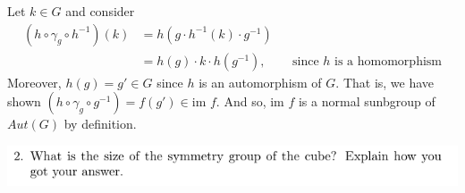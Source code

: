 \documentclass[12pt,letterpaper,boxed]{hmcpset}
\newcommand{\im}{\text{im }}
\newcommand{\inv}{^{-1}}
\begin{document}
\begin{solution}
\begin{enumerate}
	Let $k \in G$ and consider 
	\begin{align*}
		(h \circ \gamma_g \circ h\inv)(k) &= h(g \cdot h\inv(k) \cdot g\inv) \\
			&= h(g) \cdot k \cdot h(g\inv), && \text{since $h$ is a homomorphism}
	\end{align*}
	Moreover, $h(g) = g' \in G$ since $h$ is an automorphism of $G$.
	That is, we have shown $(h \circ \gamma_g \circ g\inv) = f(g') \in
	\im f$. And so, $\im f$ is a normal sunbgroup of $Aut(G)$ by
	definition.

\end{enumerate}
\end{solution}

\newpage


\begin{problem}
	\includegraphics[scale=0.8]{2.png}
	\hfill
\end{problem}

\begin{solution}
\end{solution}

\newpage

\end{document}
